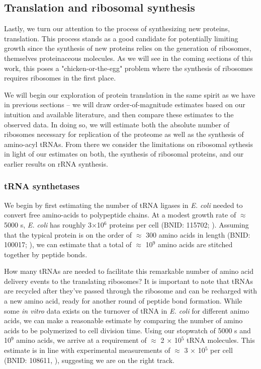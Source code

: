 \subsection{Translation and ribosomal synthesis}
Lastly, we turn our attention to the process of synthesizing new proteins,
translation. This process stands as a good candidate for potentially limiting growth
since the synthesis of new proteins relies on the generation of ribosomes,
themselves proteinaceous molecules. As we will see in the coming sections of
this work, this poses a "chicken-or-the-egg" problem where the synthesis of
ribosomes requires ribosomes in the first place.

We will begin our exploration of protein translation in the same spirit as we
have in previous sections -- we will draw order-of-magnitude estimates based on
our intuition and available literature, and then compare these estimates
to the observed data. In doing so, we will estimate both the absolute number of
ribosomes necessary for replication of the proteome as well as the synthesis of
amino-acyl tRNAs. From there we consider the limitations on ribosomal sythesis in
light of our estimates on both, the synthesis of ribosomal proteins, and
our earlier results on rRNA synthesis.

\subsubsection{tRNA synthetases}
We begin by first estimating the number of tRNA ligases in \textit{E. coli}
needed to convert free amino-acids to polypeptide chains. At a modest growth
rate of $\approx$ 5000 s, \textit{E. coli} has roughly 3$\times$10$^6$ proteins
per cell (BNID: 115702; \cite{milo2010}). Assuming that the typical protein is
on the order of $\approx$ 300 amino acids in length (BNID: 100017;
\cite{milo2010}), we can estimate that a total of $\approx$ 10$^9$ amino acids
are stitched together by peptide bonds.

How many tRNAs are needed to facilitate this remarkable number of amino acid
delivery events to the translating ribosomes? It is important to note that tRNAs
are recycled after they've passed through the ribosome and can be recharged with
a new amino acid, ready for another round of peptide bond formation. While some
\textit{in vitro} data exists on  the turnover of tRNA in \textit{E. coli} for
different  animo acids, we can make a reasonable estimate by comparing the
number of amino acids to be  polymerized to cell division time. Using our
stopwatch of 5000 s and 10$^9$ amino acids, we arrive at a requirement of
$\approx$ 2 $\times$ 10$^5$ tRNA molecules. This estimate is in line with
experimental measurements of $\approx$ 3 $\times$ 10$^5$ per cell (BNID: 108611,
\cite{milo2010}), suggesting we are on the right track.

